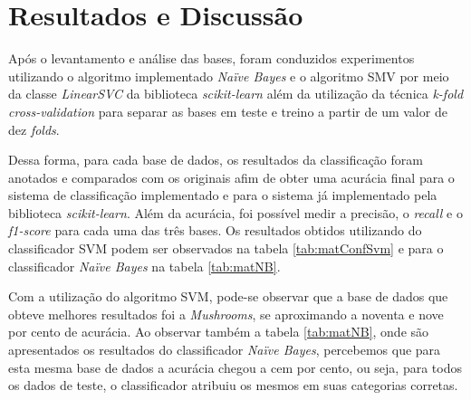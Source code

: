 \documentclass[12pt]{article}
\begin{document}
\section{Resultados e Discussão} \label{resul}
    Após o levantamento e análise das bases, foram conduzidos experimentos utilizando o algoritmo implementado \textit{Naïve Bayes} e o algoritmo SMV por meio da classe \textit{LinearSVC} da biblioteca \textit{scikit-learn} além da utilização da técnica \textit{k-fold cross-validation} para separar as bases em teste e treino a partir de um valor de dez \textit{folds}.
    
    Dessa forma, para cada base de dados, os resultados da classificação foram anotados e comparados com os originais afim de obter uma acurácia final para o sistema de classificação implementado e para o sistema já implementado pela biblioteca \textit{scikit-learn}. Além da acurácia, foi possível medir a precisão, o \textit{recall} e o \textit{f1-score} para cada uma das três bases. Os resultados obtidos utilizando do classificador SVM podem ser observados na tabela \ref{tab:matConfSvm} e para o classificador \textit{Naïve Bayes} na tabela \ref{tab:matNB}.
     
    \begin{table}[h]
            \centering
            \caption{Valores da análise das classificações realizadas, para as diferentes bases, utilizando o algoritmo \textit{Support Vector Machines}. Os valores aqui apresentados são uma média ponderada dentre as classes de cada uma das bases.}
            \label{tab:matConfSvm}
    \end{table}
    
    Com a utilização do algoritmo SVM, pode-se observar que a base de dados que obteve melhores resultados foi a \textit{Mushrooms}, se aproximando a noventa e nove por cento de acurácia. Ao observar também a tabela \ref{tab:matNB}, onde são apresentados os resultados do classificador \textit{Naïve Bayes}, percebemos que para esta mesma base de dados a acurácia chegou a cem por cento, ou seja, para todos os dados de teste, o classificador atribuiu os mesmos em suas categorias corretas. 
    
\end{document}
